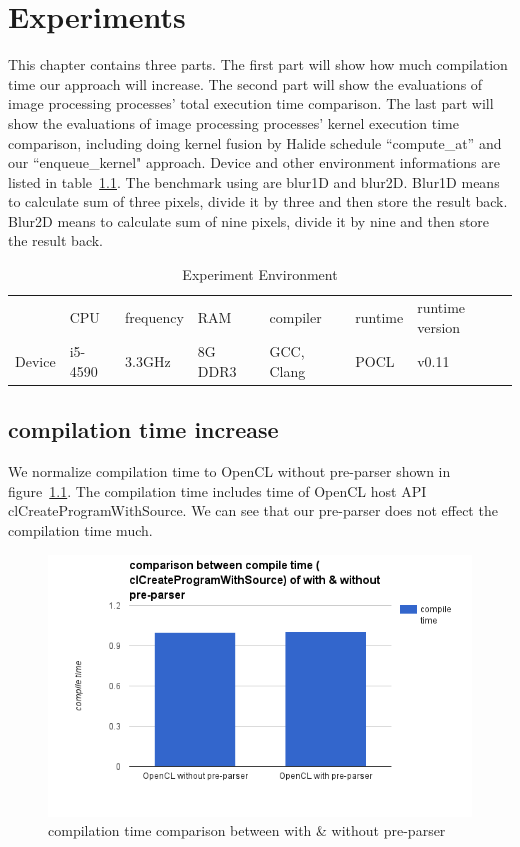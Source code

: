 \chapter{Experiments}

    This chapter contains three parts. The first part will show how much compilation time our approach will increase. The second part will show the evaluations of image processing processes' total execution time comparison. The last part will show the evaluations of image processing processes' kernel execution time comparison, including doing kernel fusion by Halide schedule “compute\_at” and our “enqueue\_kernel" approach. Device and other environment informations are listed in table~\ref{tab:my_tab_device}. The benchmark using are blur1D and blur2D. Blur1D means to calculate sum of three pixels, divide it by three and then store the result back. Blur2D means to calculate sum of nine pixels, divide it by nine and then store the result back.

\begin{table}[]
\centering
\caption{Experiment Environment}
\label{tab:my_tab_device}
\begin{tabular}{lllllll}
       & CPU     & frequency & RAM     & compiler   & runtime & runtime version \\
Device & i5-4590 & 3.3GHz    & 8G DDR3 & GCC, Clang & POCL    & v0.11          
\end{tabular}
\end{table}

\section{compilation time increase}
    We normalize compilation time to OpenCL without pre-parser shown in figure~\ref{fig:my_label_ex_1}. The compilation time includes time of OpenCL host API clCreateProgramWithSource. We can see that our pre-parser does not effect the compilation time much.

\begin{figure}[hbtp]
\centering
\includegraphics[width=14cm]{img/compile-time.png}
\caption{compilation time comparison between with \& without pre-parser}
\label{fig:my_label_ex_1}
\end{figure}

